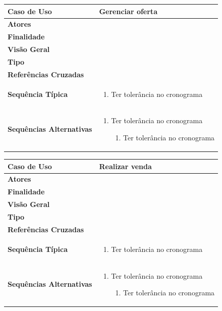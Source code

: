\documentclass[a4paper,11pt]{article}
\begin{document}
\begin{table}[H]
		\begin{tabularx}{\textwidth}{|l|X|}
		\hline
			\textbf{Caso de Uso} &  Gerenciar oferta \\ \hline
			\textbf{Atores} &    \\ \hline
			\textbf{Finalidade} &   \\ \hline
			\textbf{Visão Geral} &  \\ \hline
			\textbf{Tipo} &  \\ \hline
			\textbf{Referências Cruzadas} &  \\ \hline
			\textbf{Sequência Típica} & 
			\begin{enumerate}
			\item Ter tolerância no cronograma
			\end{enumerate} \\ \hline
			\textbf{Sequências Alternativas} & 
			\begin{enumerate}
			\item Ter tolerância no cronograma
			\begin{enumerate}
			\item Ter tolerância no cronograma
			\end{enumerate}
			\end{enumerate} \\ \hline
		\end{tabularx}
\end{table}

\begin{table}[H]
		\begin{tabularx}{\textwidth}{|l|X|}
		\hline
			\textbf{Caso de Uso} &  Realizar venda \\ \hline
			\textbf{Atores} &    \\ \hline
			\textbf{Finalidade} &   \\ \hline
			\textbf{Visão Geral} &  \\ \hline
			\textbf{Tipo} &  \\ \hline
			\textbf{Referências Cruzadas} &  \\ \hline
			\textbf{Sequência Típica} & 
			\begin{enumerate}
			\item Ter tolerância no cronograma
			\end{enumerate} \\ \hline
			\textbf{Sequências Alternativas} & 
			\begin{enumerate}
			\item Ter tolerância no cronograma
			\begin{enumerate}
			\item Ter tolerância no cronograma
			\end{enumerate}
			\end{enumerate} \\ \hline
		\end{tabularx}
\end{table}
\end{document}
